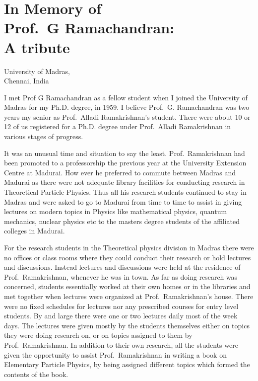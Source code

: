 \chapter[In Memory of Prof.\ G Ramachandran: A tribute]{In Memory of\\ Prof.\ G Ramachandran:\\ A tribute}\label{chap10}


\begin{center}
University of Madras,\\
Chennai, India
\end{center}

I met Prof G Ramachandran as a fellow student when I joined the University of Madras for my Ph.D. degree, in 1959. I believe Prof.\ G. Ramachandran was two years my senior as Prof.\ Alladi Ramakrishnan's student.  There were about 10 or 12 of us registered for a Ph.D. degree under Prof.\ Alladi Ramakrishnan in various stages of progress. 

It was an unusual time and situation  to say the least. Prof.\ Ramakrishnan had been promoted to a professorship the previous year at the University Extension Centre at Madurai. How ever he preferred to commute between Madras and Madurai as there were not adequate library facilities for conducting research in Theoretical Particle Physics. Thus all his research students continued to stay in Madras and were asked to go to Madurai from time to time to assist in giving lectures on modern topics in Physics like mathematical physics, quantum mechanics, nuclear physics etc to the masters degree students of the affiliated colleges in Madurai.

For the research students in the Theoretical physics division in Madras there were no offices or class rooms where they could conduct their research or hold lectures and discussions. Instead lectures and discussions were held at the residence of Prof.\ Ramakrishnan, whenever he was in town. As far as doing research was concerned, students essentially worked at their own homes or in the libraries and met together when lectures were organized at Prof.\  Ramakrishnan's house. There were no fixed schedules for lectures nor any prescribed courses for entry level students. By and large there were one or two lectures daily  most of the week days. The lectures were  given mostly by the students themselves either on topics they were doing research on, or on topics assigned to them by Prof.\ Ramakrishnan. In addition to their own research, all the students were given the opportunity to assist Prof.\ Ramakrishnan in writing a book on Elementary Particle Physics, by being assigned different topics which formed the contents of the book.

